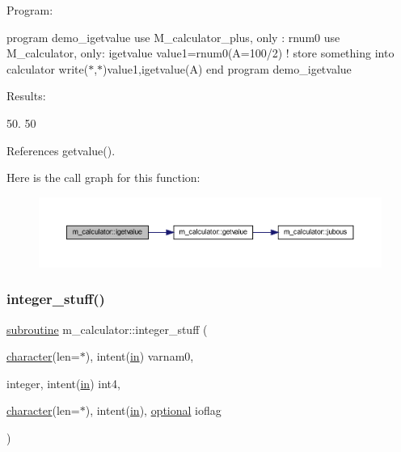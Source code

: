 Program\+:

program demo\+\_\+igetvalue use M\+\_\+calculator\+\_\+plus, only \+: rnum0 use M\+\_\+calculator, only\+: igetvalue value1=rnum0(\textquotesingle{}A=100/2\textquotesingle{}) ! store something into calculator write($\ast$,$\ast$)value1,igetvalue(\textquotesingle{}A\textquotesingle{}) end program demo\+\_\+igetvalue

Results\+:

50. 50 

References getvalue().

Here is the call graph for this function\+:
\nopagebreak
\begin{figure}[H]
\begin{center}
\leavevmode
\includegraphics[width=350pt]{namespacem__calculator_a192c846b6a8d40ddfe603f988ff82381_cgraph}
\end{center}
\end{figure}
\mbox{\label{namespacem__calculator_ae760c3bf7e4e933427bad6c92cd16dfb}} 
\subsubsection{\texorpdfstring{integer\+\_\+stuff()}{integer\_stuff()}}
{\footnotesize\ttfamily \hyperlink{M__stopwatch_83_8txt_acfbcff50169d691ff02d4a123ed70482}{subroutine} m\+\_\+calculator\+::integer\+\_\+stuff (\begin{DoxyParamCaption}\item[{\hyperlink{option__stopwatch_83_8txt_abd4b21fbbd175834027b5224bfe97e66}{character}(len=$\ast$), intent(\hyperlink{M__journal_83_8txt_afce72651d1eed785a2132bee863b2f38}{in})}]{varnam0,  }\item[{integer, intent(\hyperlink{M__journal_83_8txt_afce72651d1eed785a2132bee863b2f38}{in})}]{int4,  }\item[{\hyperlink{option__stopwatch_83_8txt_abd4b21fbbd175834027b5224bfe97e66}{character}(len=$\ast$), intent(\hyperlink{M__journal_83_8txt_afce72651d1eed785a2132bee863b2f38}{in}), \hyperlink{option__stopwatch_83_8txt_aa4ece75e7acf58a4843f70fe18c3ade5}{optional}}]{ioflag }\end{DoxyParamCaption})\hspace{0.3cm}{\ttfamily [private]}}



